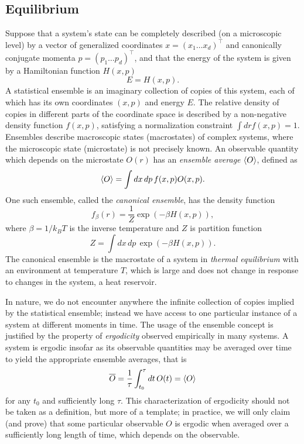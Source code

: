 \documentclass[prx,onecolumn,floatfix,longbibliography,notitlepage, nofootinbib]{revtex4-1}
\begin{document}
\begin{appendix}
\subsection{Equilibrium}
Suppose that a system's state can be completely described (on a microscopic level) by a vector of generalized coordinates $x = (x_1 \dots x_d)^\intercal$ and canonically conjugate momenta $p = (p_1 \dots p_d)^\intercal$, and that the energy of the system is given by a Hamiltonian function $H(x,p)$
\begin{equation}
    E = H(x,p).
\end{equation}
A statistical ensemble is an imaginary collection of copies of this system, each of which has its own coordinates $(x,p)$ and energy $E$. The relative density of copies in different parts of the coordinate space is described by a non-negative density function $f(x,p)$, satisfying a normalization constraint $\int dr f(x,p) = 1$. Ensembles describe macroscopic states (macrostates) of complex systems, where the microscopic state (microstate) is not precisely known. An observable quantity which depends on the microstate $O(r)$ has an \emph{ensemble average} $\braket{O}$, defined as
\begin{equation}
    \braket{O} = \int dx \, dp \, f(x,p) O(x,p).
\end{equation}
One such ensemble, called the \emph{canonical ensemble}, has the density function \cite{callen1998thermodynamics}
\begin{equation}
f_\beta(r) = \frac{1}{Z} \exp\left(-\beta H(x,p)\right),
\end{equation}
where $\beta = 1/k_B T$ is the inverse temperature and $Z$ is partition function
\begin{equation}
    Z = \int dx\, dp \, \exp\left( -\beta H(x,p)\right).
\end{equation}
The canonical ensemble is the macrostate of a system in \emph{thermal equilibrium} with an environment at temperature $T$, which is large and does not change in response to changes in the system, a heat reservoir. 

In nature, we do not encounter anywhere the infinite collection of copies implied by the statistical ensemble; instead we have access to one particular instance of a system at different moments in time. The usage of the ensemble concept is justified by the property of \emph{ergodicity} observed empirically in many systems. A system is ergodic insofar as its observable quantities may be averaged over time to yield the appropriate ensemble averages, that is \cite{zwanzig2001nonequilibrium}
\begin{equation}
  \overline{O} =   \frac{1}{\tau} \int_{t_0}^\tau dt \, O(t) = \braket{O}
\end{equation}
for any $t_0$ and sufficiently long $\tau$. This characterization of ergodicity should not be taken as a definition, but more of a template; in practice, we will only claim (and prove) that some particular observable $O$ is ergodic when averaged over a sufficiently long length of time, which depends on the observable.


\end{appendix}
\end{document}
